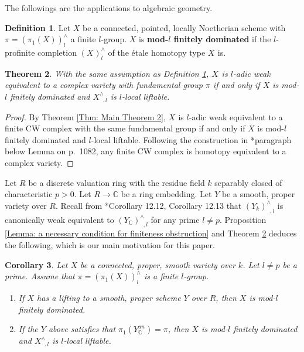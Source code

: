 \documentclass[11pt]{amsart}
\newtheorem{theorem}{Theorem}[section]
\newtheorem{corollary}[theorem]{Corollary}
\theoremstyle{definition}
\newtheorem{definition}[theorem]{Definition}
\numberwithin{equation}{section}
\numberwithin{equation}{section}
\newcommand\CC{\mathbb{C}}
\DeclareMathOperator{\et}{\acute{e}t}
\begin{document}
The followings are the applications to algebraic geometry.

\begin{definition}\label{Def: Finite Dominatedness for Schemes}
Let $X$ be a connected, pointed, locally Noetherian scheme with $\pi=(\pi^{\et}_1(X))^{\wedge}_l$ a finite $l$-group. $X$ is \textbf{mod-$l$ finitely dominated} if the $l$-profinite completion $(X_{\et})^{\wedge}_l$ of the \'etale homotopy type $X_{\et}$ is.
\end{definition}

\begin{theorem}\label{Cor: Cor 1}
With the same assumption as Definition \ref{Def: Finite Dominatedness for Schemes}, $X_{\et}$ is $l$-adic weak equivalent to a complex variety with fundamental group $\pi$ if and only if $X$ is mod-$l$ finitely dominated and $X^{\wedge}_{\et,l}$ is $l$-local liftable.
\end{theorem}

\begin{proof}
By Theorem \ref{Thm: Main Theorem 2}, $X_{\et}$ is $l$-adic weak equivalent to a finite CW complex with the same fundamental group if and only if $X$ is mod-$l$ finitely dominated and $l$-local liftable. Following the construction in \cite{Deligne-Sullivan}*{paragraph below Lemma on p.~1082}, any finite CW complex is homotopy equivalent to a complex variety.
\end{proof}
Let $R$  be a discrete valuation ring with the residue field $k$ separably closed of characteristic $p>0$. Let $R\rightarrow \CC$ be a ring embedding. Let $Y$ be a smooth, proper variety over $R$.
Recall from \cite{artin-mazur-etale-homotopy}*{Corollary 12.12, Corollary 12.13} that $(Y_k)^{\wedge}_{\et,l}$ is canonically weak equivalent to $(Y_
{\CC})^{\wedge}_{\et,l}$ for any prime $l\neq p$. Proposition \ref{Lemma: a necessary condition for finiteness obstruction} and Theorem \ref{Cor: Cor 1} deduces the following, which is our main motivation for this paper.

\begin{corollary}\label{cor: last cor}
Let $X$ be a connected, proper, smooth variety over $k$. Let $l\neq p$ be a prime. Assume that $\pi=(\pi^{\et}_1(X))^{\wedge}_l$ is a finite $l$-group. 
\begin{enumerate}
    \item If $X$ has a lifting to a smooth, proper scheme $Y$ over $R$, then $X$ is mod-$l$ finitely dominated.
    \item If the $Y$ above satisfies that $\pi_1(Y^{an}_\CC)=\pi$, then  $X$ is mod-$l$ finitely dominated and $X^{\wedge}_{\et,l}$ is $l$-local liftable.
\end{enumerate}
\end{corollary}
\end{document}
